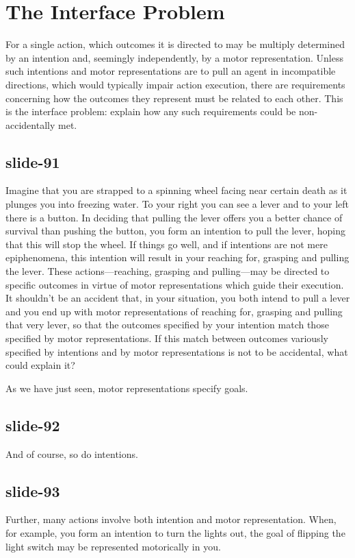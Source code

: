 \documentclass[12pt,\papersize]{extarticle}
\begin{document}
 
\section{The Interface Problem}
 
For a single action, which outcomes it is directed to may be multiply
determined by an intention and, seemingly independently, by a motor
representation. Unless such intentions and motor representations are to pull
an agent in incompatible directions, which would typically impair action
execution, there are requirements concerning how the outcomes they represent
must be related to each other. This is the interface problem: explain how any
such requirements could be non-accidentally met.
 
\subsection{slide-91}
Imagine that you are strapped to a spinning wheel facing near certain death as it plunges you into
freezing water. To your right you can see a lever and to your left there is a button. In deciding
that pulling the lever offers you a better chance of survival than pushing the button, you form an
intention to pull the lever, hoping that this will stop the wheel. If things go well, and if
intentions are not mere epiphenomena, this intention will result in your reaching for, grasping and
pulling the lever. These actions---reaching, grasping and pulling---may be directed to specific
outcomes in virtue of motor representations which guide their execution. It shouldn't be an accident
that, in your situation, you both intend to pull a lever and you end up with motor representations
of reaching for, grasping and pulling that very lever, so that the outcomes specified by your
intention match those specified by motor representations. If this match between outcomes variously
specified by intentions and by motor representations is not to be accidental, what could explain it?
 
As we have just seen, motor representations specify goals.
 
\subsection{slide-92}
And of course, so do intentions.
 
\subsection{slide-93}
Further, many actions involve both intention and motor representation.
When, for example, you form an intention to turn the lights out, the goal
of flipping the light switch may be represented motorically in you.
 
\end{document}
